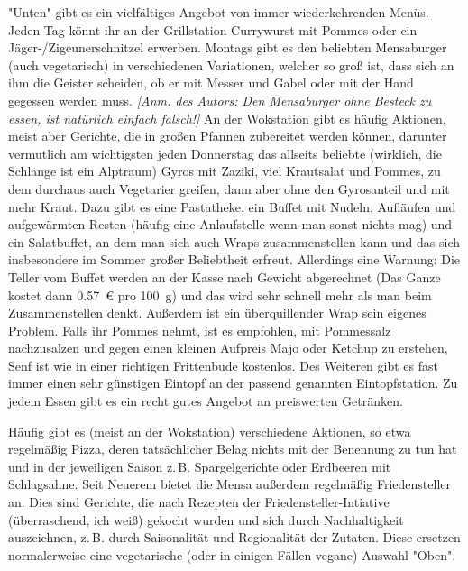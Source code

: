 \begin{multicols*}{2}

"Unten" gibt es ein vielfältiges Angebot von immer wiederkehrenden Menüs.
Jeden Tag könnt ihr an der Grillstation Currywurst mit Pommes oder ein Jäger-/Zigeunerschnitzel erwerben.
Montags gibt es den beliebten Mensaburger (auch vegetarisch) in verschiedenen Variationen, welcher so groß ist, dass sich an ihm die Geister scheiden, ob er mit Messer und Gabel oder mit der Hand gegessen werden muss. \textit{[Anm. des Autors: Den Mensaburger ohne Besteck zu essen, ist natürlich einfach falsch!]}
An der Wokstation gibt es häufig Aktionen, meist aber Gerichte, die in großen Pfannen zubereitet werden können,  darunter vermutlich am wichtigsten jeden Donnerstag das allseits beliebte (wirklich, die Schlange ist ein Alptraum) Gyros mit Zaziki, viel Krautsalat und Pommes, zu dem durchaus auch Vegetarier greifen, dann aber ohne den Gyrosanteil und mit mehr Kraut.
Dazu gibt es eine Pastatheke, ein Buffet mit Nudeln, Aufläufen und aufgewärmten Resten (häufig eine Anlaufstelle wenn man sonst nichts mag) und ein Salatbuffet, an dem man sich auch Wraps zusammenstellen kann und das sich insbesondere im Sommer großer Beliebtheit erfreut. Allerdings eine Warnung: Die Teller vom Buffet werden an der Kasse nach Gewicht abgerechnet (Das Ganze kostet dann \SI{0,57}{\euro} pro \SI{100}{\g}) und das wird sehr schnell mehr als man beim Zusammenstellen denkt. Außerdem ist ein überquillender Wrap sein eigenes Problem.
Falls ihr Pommes nehmt, ist es empfohlen, mit Pommessalz nachzusalzen und gegen einen kleinen Aufpreis Majo oder Ketchup zu erstehen, Senf ist wie in einer richtigen Frittenbude kostenlos.
Des Weiteren gibt es fast immer einen sehr günstigen Eintopf an der passend genannten Eintopfstation.
Zu jedem Essen gibt es ein recht gutes Angebot an preiswerten Getränken.

Häufig gibt es (meist an der Wokstation) verschiedene Aktionen, so etwa regelmäßig Pizza, deren tatsächlicher Belag nichts mit der Benennung zu tun hat und in der jeweiligen Saison z.\,B. Spargelgerichte oder Erdbeeren mit Schlagsahne. Seit Neuerem bietet die Mensa außerdem regelmäßig Friedensteller an. Dies sind Gerichte, die nach Rezepten der Friedensteller-Intiative (überraschend, ich weiß) gekocht wurden und sich durch Nachhaltigkeit auszeichnen, z.\,B. durch Saisonalität und Regionalität der Zutaten. Diese ersetzen normalerweise eine vegetarische (oder in einigen Fällen vegane) Auswahl "Oben".


\end{multicols*}
